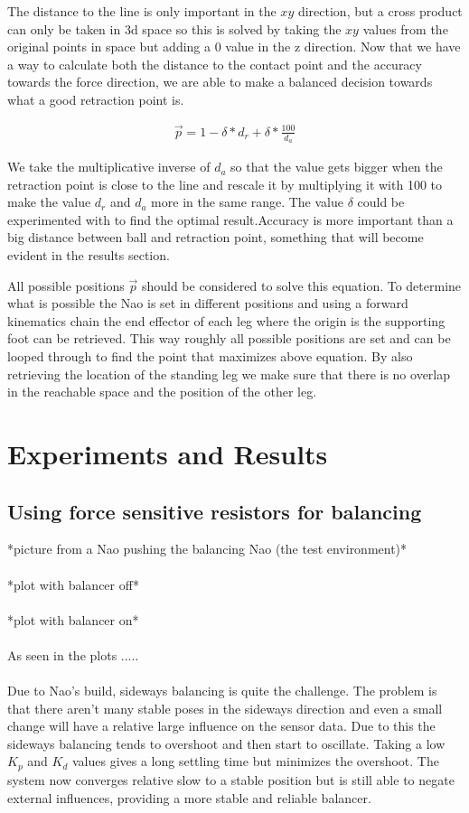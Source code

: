 \documentclass[a4paper]{article}
\begin{document}
The distance to the line is only important in the $xy$ direction, but a cross
product can only be taken in 3d space so this is solved by taking the $xy$
values from the original points in space but adding a 0 value in the z
direction.
Now that we have a way to calculate both the distance to the contact point and
the accuracy towards the force direction, we are able to make a balanced
decision towards what a good retraction point is.

\begin{align}
    \vec{p} = 1-\delta * d_r + \delta * \frac{100}{d_a}
\label{eq:delta}
\end{align}

We take the multiplicative inverse of $d_a$ so that the value gets bigger when the
retraction point is close to the line and rescale it by multiplying it with 100 to
make the value $d_r$ and $d_a$ more in the same range. The value $\delta$  could
be experimented with to find the optimal result.Accuracy is more important than a big distance between ball and
retraction point, something that will become evident in the results section.

All possible positions $\vec{p}$ should be considered to solve this equation. To
determine what is possible the Nao is set in different positions and using a
forward kinematics chain the end effector of each leg where the origin is the
supporting foot can be retrieved. This way roughly all possible positions are set and can be
looped through to find the point that maximizes above equation. By also
retrieving the location of the standing leg we make sure that there is
no overlap in the reachable space and the position of the other leg.

\section{Experiments and Results}

\subsection{Using force sensitive resistors for balancing}
*picture from a Nao pushing the balancing Nao (the test environment)*\\\\
*plot with balancer off*\\\\
*plot with balancer on*\\\\
As seen in the plots .....\\\\
Due to Nao's build, sideways balancing is quite the challenge.
The problem is that there aren't many stable poses in the sideways direction and even a small change will have a relative large influence on the sensor data.
Due to this the sideways balancing tends to overshoot and then start to oscillate.
Taking a low $K_p$ and $K_d$ values gives a long settling time but minimizes the overshoot.  
The system now converges relative slow to a stable position but is still able to negate external influences, providing a more stable and reliable balancer. 
\end{document}
